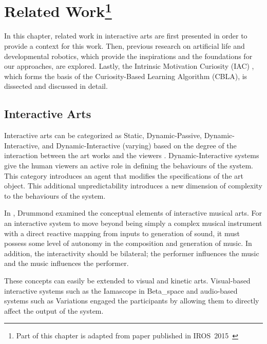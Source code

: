 \chapter[Related Work]{Related Work\footnote{Part of this chapter is adapted from paper published in IROS~2015~\cite{Chan2015}}} 
 \label{chap:related_work}

In this chapter, related work in interactive arts are first presented in order to provide a context for this work. Then, previous research on artificial life and developmental robotics, which provide the inspirations and the foundations for our approaches, are explored. Lastly, the Intrinsic Motivation Curiosity (IAC) \cite{Oudeyer2007}, which forms the basis of the Curiosity-Based Learning Algorithm (CBLA), is dissected and discussed in detail.

\section{Interactive Arts}
Interactive arts can be categorized as Static, Dynamic-Passive, Dynamic-Interactive, and Dynamic-Interactive (varying) based on the degree of the interaction between the art works and the viewers \cite{Edmonds2004}. Dynamic-Interactive systems give the human viewers an active role in defining the behaviours of the system. This category introduces an agent that modifies the specifications of the art object. This additional unpredictability introduces a new dimension of complexity to the behaviours of the system. 

In \cite{Drummond2009}, Drummond examined the conceptual elements of interactive musical arts. For an interactive system to move beyond being simply a complex musical instrument with a direct reactive mapping from inputs to generation of sound, it must possess some level of autonomy in the composition and generation of music. In addition, the interactivity should be bilateral; the performer influences the music and the music influences the performer. 

These concepts can easily be extended to visual and kinetic arts. Visual-based interactive systems such as the Iamascope in Beta\_space \cite{Costello2005} and audio-based systems such as Variations \cite{Wands2005} engaged the participants by allowing them to directly affect the output of the system. %

